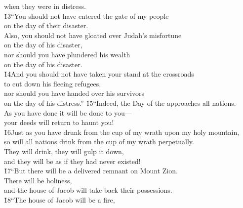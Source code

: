 \begin{poetry}
\poemll    when they were in distress. \\
\poeml \v{13}``You should not have entered the gate of my people \\
\poemll    on the day of their disaster. \\
\poeml Also, you should not have gloated over Judah's misfortune \\
\poemll    on the day of his disaster, \\
\poeml nor should you have plundered his wealth \\
\poemll    on the day of his disaster. \\
\poeml \v{14}And you should not have taken your stand at the crossroads \\
\poemll    to cut down his fleeing refugees, \\
\poeml nor should you have handed over his survivors \\
\poemll    on the day of his distress.''
\poeml \v{15}``Indeed, the Day of the  approaches all nations. \\
\poemll    As you have done it will be done to you--- \\
\poemlll       your deeds will return to haunt you! \\
\poeml \v{16}Just as you have drunk from the cup of my wrath upon my holy mountain, \\
\poemll    so will all nations drink from the cup of my wrath perpetually. \\
\poeml They will drink, they will gulp it down, \\
\poemll    and they will be as if they had never existed! \\
\poeml \v{17}``But there will be a delivered remnant on Mount Zion. \\
\poemll    There will be holiness, \\
\poemlll       and the house of Jacob will take back their possessions. \\
\poeml \v{18}``The house of Jacob will be a fire, \\

\end{poetry}
